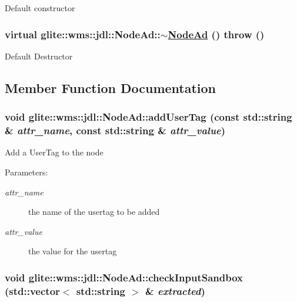 Default constructor\hypertarget{classglite_1_1wms_1_1jdl_1_1NodeAd_a2}{
\subsubsection[$\sim$NodeAd]{\setlength{\rightskip}{0pt plus 5cm}virtual glite::wms::jdl::Node\-Ad::$\sim$\hyperlink{classglite_1_1wms_1_1jdl_1_1NodeAd}{Node\-Ad} ()  throw ()}}
\label{classglite_1_1wms_1_1jdl_1_1NodeAd_a2}


Default Destructor 

\subsection{Member Function Documentation}
\hypertarget{classglite_1_1wms_1_1jdl_1_1NodeAd_a4}{
\subsubsection[addUserTag]{\setlength{\rightskip}{0pt plus 5cm}void glite::wms::jdl::Node\-Ad::add\-User\-Tag (const std::string \& {\em attr\_\-name}, const std::string \& {\em attr\_\-value})}}
\label{classglite_1_1wms_1_1jdl_1_1NodeAd_a4}


Add a User\-Tag to the node \begin{Desc}
\item[Parameters:]
\begin{description}
\item[{\em attr\_\-name}]the name of the usertag to be added \item[{\em attr\_\-value}]the value for the usertag\end{description}
\end{Desc}
\hypertarget{classglite_1_1wms_1_1jdl_1_1NodeAd_b0}{
\subsubsection[checkInputSandbox]{\setlength{\rightskip}{0pt plus 5cm}void glite::wms::jdl::Node\-Ad::check\-Input\-Sandbox (std::vector$<$ std::string $>$ \& {\em extracted})}}
\label{classglite_1_1wms_1_1jdl_1_1NodeAd_b0}


